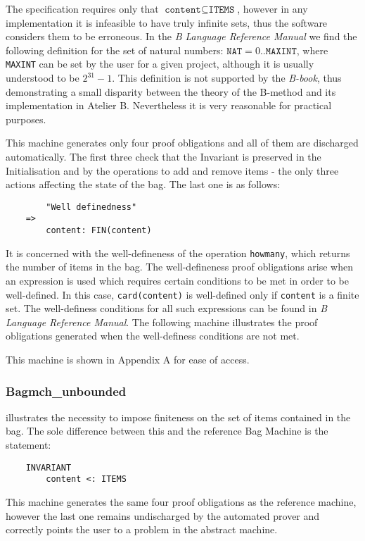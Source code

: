 \documentclass[11pt,journal]{IEEEtran}
\begin{document}
	The specification requires only that $\texttt{content} \subseteq \texttt{ITEMS}$, however in any implementation it is infeasible to have truly infinite sets, thus the software considers them to be erroneous. In the \emph{B Language Reference Manual}\cite{b reference} we find the following definition for the set of natural numbers: ${\texttt{NAT}  = 0 .. \texttt{MAXINT}}$, where \texttt{MAXINT} can be set by the user for a given project, although it is usually understood to be $2^{31}-1$. This definition is not supported by the \emph{B-book}, thus demonstrating a small disparity between the theory of the B-method and its implementation in Atelier B. Nevertheless it is very reasonable for practical purposes.
	
	This machine generates only four proof obligations and all of them are discharged automatically. The first three check that the Invariant is preserved in the Initialisation and by the operations to add and remove items - the only three actions affecting the state of the bag. The last one is as follows:
	
	\begin{lstlisting}
		"Well definedness" 
	=> 
		content: FIN(content)
	\end{lstlisting}
	
	It is concerned with the well-defineness of the operation \texttt{howmany}, which returns the number of items in the bag. The well-defineness proof obligations arise when an expression is used which requires certain conditions to be met in order to be well-defined. In this case, \texttt{card(content)} is well-defined only if \texttt{content} is a finite set. The well-definess conditions for all such expressions can be found in \emph{B Language Reference Manual}\cite{b reference}. The following machine illustrates the proof obligations generated when the well-definess conditions are not met.
	
	This machine is shown in Appendix A for ease of access.
	
	\subsubsection{Bagmch\_unbounded} illustrates the necessity to impose finiteness on the set of items contained in the bag. The sole difference between this and the reference Bag Machine is the statement:
	
	\begin{lstlisting}
	INVARIANT
		content <: ITEMS
	\end{lstlisting}
	This machine generates the same four proof obligations as the reference machine, however the last one remains undischarged by the automated prover and correctly points the user to a problem in the abstract machine. 
	
\end{document}
